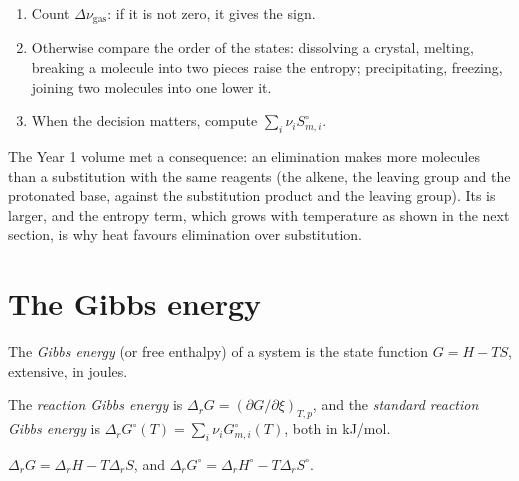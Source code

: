 \begin{method}\label{met:b2:reaction-free-energy:entropy-sign}
\begin{enumerate}
  \item Count $\Delta\nu_{\text{gas}}$: if it is not zero, it gives the
        sign.
  \item Otherwise compare the order of the states: dissolving a crystal,
        melting, breaking a molecule into two pieces raise the entropy;
        precipitating, freezing, joining two molecules into one lower it.
  \item When the decision matters, compute $\sum_i\nu_iS^\circ_{m,i}$.
\end{enumerate}
\end{method}

The Year 1 volume met a consequence: an elimination makes more molecules
than a substitution with the same reagents (the alkene, the leaving group
and the protonated base, against the substitution product and the leaving
group). Its  is larger, and the entropy term, which grows
with temperature as shown in the next section, is why heat favours
elimination over substitution.

\section{The Gibbs energy}

\begin{definition}\label{def:b2:reaction-free-energy:gibbs-energy}
The \emph{Gibbs energy} (or free enthalpy) of a system
is the state function $G = H - TS$, extensive, in joules.
\end{definition}

\begin{definition}\label{def:b2:reaction-free-energy:reaction-gibbs}
The \emph{reaction Gibbs energy} is $\Delta_r G
= (\partial G/\partial\xi)_{T,p}$, and the \emph{standard reaction Gibbs
energy} is $\Delta_r G^\circ(T) =
\sum_i\nu_iG^\circ_{m,i}(T)$, both in \unit{kJ/mol}.
\end{definition}

\begin{proposition}\label{prop:b2:reaction-free-energy:g-h-s}
$\Delta_r G = \Delta_r H - T\Delta_r S$, and $\Delta_r G^\circ = \Delta_r
H^\circ - T\Delta_r S^\circ$.
\end{proposition}

